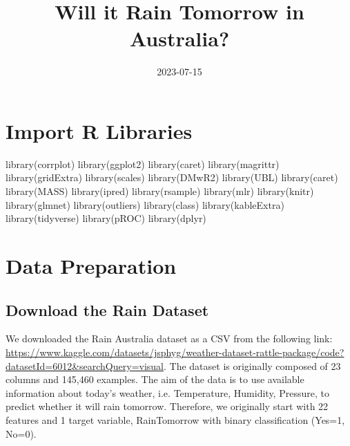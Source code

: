 \documentclass[
]{article}
\title{Will it Rain Tomorrow in Australia?}
\author{}
\date{\vspace{-2.5em}2023-07-15}
\newenvironment{Shaded}{\begin{snugshade}}{\end{snugshade}}
\newcommand{\FunctionTok}[1]{\textcolor[rgb]{0.00,0.00,0.00}{#1}}
\newcommand{\NormalTok}[1]{#1}
\begin{document}
\maketitle

{
\setcounter{tocdepth}{2}
\tableofcontents
}
\hypertarget{import-r-libraries}{%
\section{Import R Libraries}\label{import-r-libraries}}

\begin{Shaded}
\begin{Highlighting}[]
\FunctionTok{library}\NormalTok{(corrplot)}
\FunctionTok{library}\NormalTok{(ggplot2)}
\FunctionTok{library}\NormalTok{(caret)}
\FunctionTok{library}\NormalTok{(magrittr)}
\FunctionTok{library}\NormalTok{(gridExtra)  }
\FunctionTok{library}\NormalTok{(scales)}
\FunctionTok{library}\NormalTok{(DMwR2)}
\FunctionTok{library}\NormalTok{(UBL)}
\FunctionTok{library}\NormalTok{(caret)}
\FunctionTok{library}\NormalTok{(MASS)}
\FunctionTok{library}\NormalTok{(ipred)}
\FunctionTok{library}\NormalTok{(rsample)}
\FunctionTok{library}\NormalTok{(mlr)}
\FunctionTok{library}\NormalTok{(knitr)}
\FunctionTok{library}\NormalTok{(glmnet)}
\FunctionTok{library}\NormalTok{(outliers)}
\FunctionTok{library}\NormalTok{(class)}
\FunctionTok{library}\NormalTok{(kableExtra)}
\FunctionTok{library}\NormalTok{(tidyverse)}
\FunctionTok{library}\NormalTok{(pROC)}
\FunctionTok{library}\NormalTok{(dplyr)}
\end{Highlighting}
\end{Shaded}

\hypertarget{data-preparation}{%
\section{Data Preparation}\label{data-preparation}}

\hypertarget{download-the-rain-dataset}{%
\subsection{Download the Rain Dataset}\label{download-the-rain-dataset}}

We downloaded the Rain Australia dataset as a CSV from the following
link:
\url{https://www.kaggle.com/datasets/jsphyg/weather-dataset-rattle-package/code?datasetId=6012\&searchQuery=visual}.
The dataset is originally composed of 23 columns and 145,460 examples.
The aim of the data is to use available information about today's
weather, i.e. Temperature, Humidity, Pressure, to predict whether it
will rain tomorrow. Therefore, we originally start with 22 features and
1 target variable, RainTomorrow with binary classification (Yes=1,
No=0).
\end{document}
